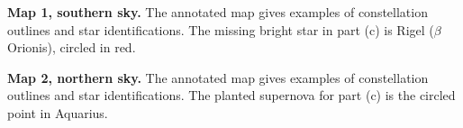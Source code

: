 \noindent\begin{minipage}{\linewidth}
\textbf{Map 1, southern sky.}
The annotated map gives examples of constellation outlines and star identifications.
The missing bright star in part (c) is Rigel (\(\beta\) Orionis), circled in red.
\end{minipage}\par

\noindent\begin{minipage}{\linewidth}
\textbf{Map 2, northern sky.}
The annotated map gives examples of constellation outlines and star identifications.
The planted supernova for part (c) is the circled point in Aquarius.
\end{minipage}\par
